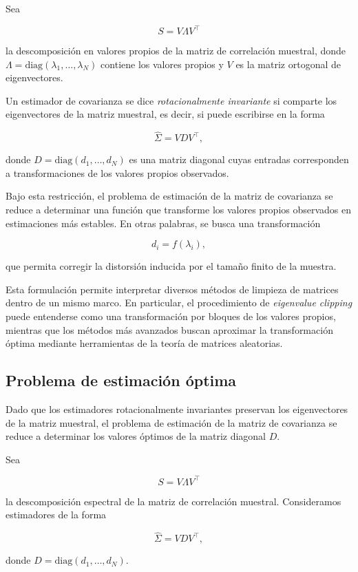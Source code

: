 \documentclass[letterpaper,12pt,oneside]{book}
\begin{document}
Sea

\[
S = V \Lambda V^\top
\]

la descomposición en valores propios de la matriz de correlación muestral, donde $\Lambda=\mathrm{diag}(\lambda_1,\dots,\lambda_N)$ contiene los valores propios y $V$ es la matriz ortogonal de eigenvectores.

Un estimador de covarianza se dice \textit{rotacionalmente invariante} si comparte los eigenvectores de la matriz muestral, es decir, si puede escribirse en la forma

\[
\hat{\Sigma} = V D V^\top,
\]

donde $D=\mathrm{diag}(d_1,\dots,d_N)$ es una matriz diagonal cuyas entradas corresponden a transformaciones de los valores propios observados.

Bajo esta restricción, el problema de estimación de la matriz de covarianza se reduce a determinar una función que transforme los valores propios observados en estimaciones más estables. En otras palabras, se busca una transformación

\[
d_i = f(\lambda_i),
\]

que permita corregir la distorsión inducida por el tamaño finito de la muestra.

Esta formulación permite interpretar diversos métodos de limpieza de matrices dentro de un mismo marco. En particular, el procedimiento de \textit{eigenvalue clipping} puede entenderse como una transformación por bloques de los valores propios, mientras que los métodos más avanzados buscan aproximar la transformación óptima mediante herramientas de la teoría de matrices aleatorias.

\subsection*{Problema de estimación óptima}

Dado que los estimadores rotacionalmente invariantes preservan los eigenvectores de la matriz muestral, el problema de estimación de la matriz de covarianza se reduce a determinar los valores óptimos de la matriz diagonal $D$.

Sea

\[
S = V \Lambda V^\top
\]

la descomposición espectral de la matriz de correlación muestral. Consideramos estimadores de la forma

\[
\hat{\Sigma} = V D V^\top,
\]

donde $D=\mathrm{diag}(d_1,\dots,d_N)$.
\end{document}
